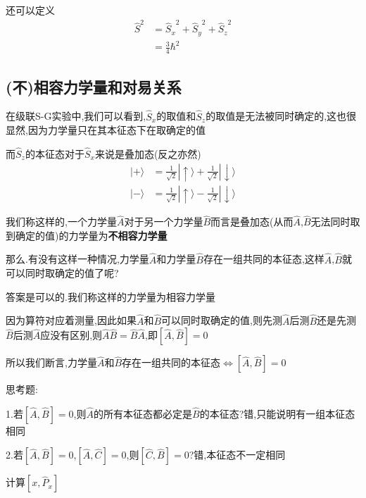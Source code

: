 \documentclass[lang=cn,10pt]{elegantbook}
\begin{document}
还可以定义
\begin{equation*}
	\begin{split}
		\hat{S}^2&={\hat{S}_x}^2+{\hat{S}_y}^2+{\hat{S}_z}^2
		\\
		&=\frac{3}{4}\hbar ^2
	\end{split}
\end{equation*}
\subsection{(不)相容力学量和对易关系}

在级联S-G实验中,我们可以看到,$\hat{S}_{x}$的取值和$\hat{S}_{z}$的取值是无法被同时确定的,这也很显然,因为力学量只在其本征态下在取确定的值

而$\hat{S}_{z}$的本征态对于$\hat{S}_{x}$来说是叠加态(反之亦然)
 \begin{equation*}
	\begin{split}
		|+\rangle &=\frac{1}{\sqrt{2}}|\uparrow \rangle +\frac{1}{\sqrt{2}}|\downarrow \rangle 
		\\
			|-\rangle &=\frac{1}{\sqrt{2}}|\uparrow \rangle -\frac{1}{\sqrt{2}}|\downarrow \rangle 
	\end{split}
\end{equation*}

我们称这样的,一个力学量$\hat{A}$对于另一个力学量$\hat{B}$而言是叠加态(从而$\hat{A}$,$\hat{B}$无法同时取到确定的值)的力学量为\textbf{不相容力学量}

那么.有没有这样一种情况,力学量$\hat{A}$和力学量$\hat{B}$存在一组共同的本征态,这样$\hat{A}$,$\hat{B}$就可以同时取确定的值了呢?

答案是可以的.我们称这样的力学量为相容力学量

	因为算符对应着测量,因此如果$\hat{A}$和$\hat{B}$可以同时取确定的值,则先测$\hat{A}$后测$\hat{B}$还是先测$\hat{B}$后测$\hat{A}$应没有区别,则$\hat{A}\hat{B}=\hat{B}\hat{A}$,即$[\hat{A},\hat{B}]=0$

所以我们断言,$\text{力学量}\hat{A}\text{和}\hat{B}\text{存在一组共同的本征态}\Leftrightarrow \left[ \hat{A},\hat{B} \right] =0$


思考题:

1.若$\left[ \hat{A},\hat{B} \right] =0$,则$\hat{A}$的所有本征态都必定是$\hat{B}$的本征态?错,只能说明有一组本征态相同

2.若$\left[ \hat{A},\hat{B} \right] =0$,$\left[ \hat{A},\hat{C} \right] =0$,则$\left[ \hat{C},\hat{B} \right] =0$?错,本征态不一定相同



	计算$[x,\hat{P}_x]$
\end{document}
